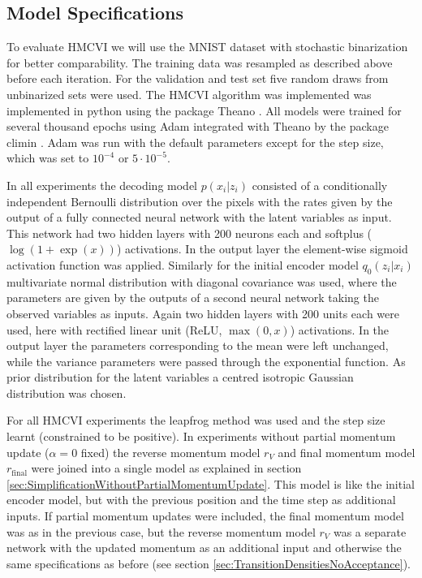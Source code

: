 \subsection{Model Specifications}
\label{sec:ModelSpecifications}
To evaluate HMCVI we will use the MNIST dataset with stochastic binarization for better comparability. The training data was resampled as described above before each iteration. For the validation and test set five random draws from unbinarized sets were used. The HMCVI algorithm was implemented was implemented in python using the package Theano \parencite{Bergstra2010, Bastien2012}. All models were trained for several thousand epochs using Adam \parencite{Kingma2015} integrated with Theano by the package climin \parencite{Bayer2015}. Adam was run with the default parameters except for the step size, which was set to $10^{-4}$ or $5 \cdot 10^{-5}$.

In all experiments the decoding model $p(x_i|z_i)$ consisted of a conditionally independent Bernoulli distribution over the pixels with the rates given by the output of a fully connected neural network with the latent variables as input. This network had two hidden layers with 200 neurons each and softplus ($\log(1 + \exp(x))$) activations. In the output layer the element-wise sigmoid activation function was applied. Similarly for the initial encoder model $q_0(z_i|x_i)$ multivariate normal distribution with diagonal covariance was used, where the parameters are given by the outputs of a second neural network taking the observed variables as inputs. Again two hidden layers with 200 units each were used, here with rectified linear unit (ReLU, $\max(0, x)$) activations. In the output layer the parameters corresponding to the mean were left unchanged, while the variance parameters were passed through the exponential function. As prior distribution for the latent variables a centred isotropic Gaussian distribution was chosen. 

For all HMCVI experiments the leapfrog method was used and the step size learnt (constrained to be positive). In experiments without partial momentum update ($\alpha = 0$ fixed) the reverse momentum model $r_V$ and final momentum model $r_\textrm{final}$ were joined into a single model as explained in section \ref{sec:SimplificationWithoutPartialMomentumUpdate}. This model is like the initial encoder model, but with the previous position and the time step as additional inputs. If partial momentum updates were included, the final momentum model was as in the previous case, but the reverse momentum model $r_V$ was a separate network with the updated momentum as an additional input and otherwise the same specifications as before (see section \ref{sec:TransitionDensitiesNoAcceptance}).

